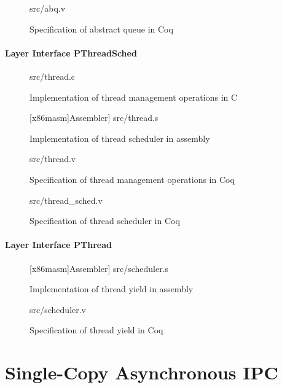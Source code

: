 \begin{figure}
	 {src/abq.v}
	\caption{Specification of abstract queue in Coq}
	\label{fig:abq_v}
\end{figure}

\paragraph{Layer Interface PThreadSched}

\begin{figure}
	 {src/thread.c}
	\caption{Implementation of thread management operations in C}
	\label{fig:thread_c}
\end{figure}

\begin{figure}
	{[x86masm]Assembler}] {src/thread.s}
	\caption{Implementation of thread scheduler in assembly}
	\label{fig:thread_s}
\end{figure}



\begin{figure}
	 {src/thread.v}
	\caption{Specification of thread management operations in Coq}
	\label{fig:thread_v}
\end{figure}


\begin{figure}
	 {src/thread_sched.v}
	\caption{Specification of thread scheduler in Coq}
	\label{fig:thread_sched_v}
\end{figure}

\paragraph{Layer Interface PThread}


\begin{figure}
	{[x86masm]Assembler}] {src/scheduler.s}
	\caption{Implementation of thread yield in assembly}
	\label{fig:scheduler_s}
\end{figure}

\begin{figure}
	 {src/scheduler.v}
	\caption{Specification of thread yield in Coq}
	\label{fig:scheduler_v}
\end{figure}

\section{Single-Copy Asynchronous IPC}

